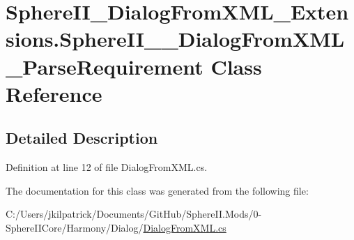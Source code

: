 \hypertarget{class_sphere_i_i___dialog_from_x_m_l___extensions_1_1_sphere_i_i_____dialog_from_x_m_l___parse_requirement}{}\section{Sphere\+I\+I\+\_\+\+Dialog\+From\+X\+M\+L\+\_\+\+Extensions.\+Sphere\+I\+I\+\_\+\+\_\+\+Dialog\+From\+X\+M\+L\+\_\+\+Parse\+Requirement Class Reference}
\label{class_sphere_i_i___dialog_from_x_m_l___extensions_1_1_sphere_i_i_____dialog_from_x_m_l___parse_requirement}


\subsection{Detailed Description}


Definition at line 12 of file Dialog\+From\+X\+M\+L.\+cs.



The documentation for this class was generated from the following file\+:\begin{DoxyCompactItemize}
\item 
C\+:/\+Users/jkilpatrick/\+Documents/\+Git\+Hub/\+Sphere\+I\+I.\+Mods/0-\/\+Sphere\+I\+I\+Core/\+Harmony/\+Dialog/\mbox{\hyperlink{_dialog_from_x_m_l_8cs}{Dialog\+From\+X\+M\+L.\+cs}}\end{DoxyCompactItemize}
